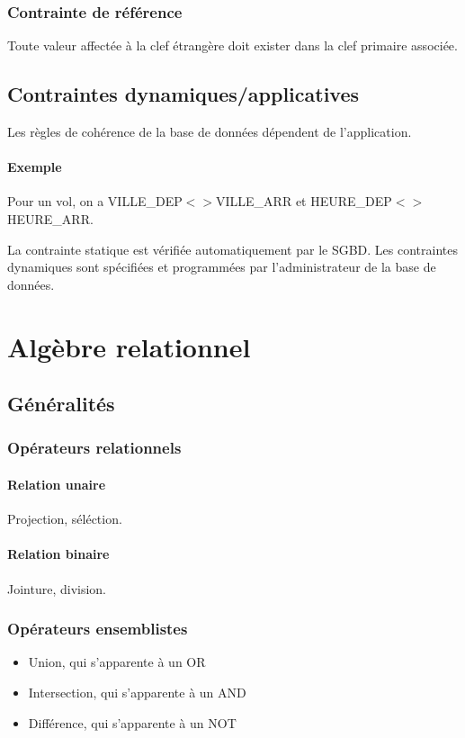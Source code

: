 \documentclass[10pt]{article}
\begin{document}
            \subsubsection*{Contrainte de référence}
                Toute valeur affectée à la clef étrangère doit exister dans la clef primaire associée.

        \subsection{Contraintes dynamiques/applicatives}
            Les règles de cohérence de la base de données dépendent de l'application.

            \paragraph{Exemple}
                Pour un vol, on a VILLE\_DEP$<>$VILLE\_ARR et HEURE\_DEP$<>$HEURE\_ARR.
                
            La contrainte statique est vérifiée automatiquement par le SGBD. Les contraintes dynamiques sont spécifiées et programmées par l'administrateur de la base de données.

    \section{Algèbre relationnel}
        \subsection{Généralités}
            \subsubsection*{Opérateurs relationnels}
                \paragraph{Relation unaire}
                    Projection, séléction.

                \paragraph{Relation binaire}
                    Jointure, division.

            \subsubsection*{Opérateurs ensemblistes}
                \begin{itemize}
                    \item Union, qui s'apparente à un OR
                    \item Intersection, qui s'apparente à un AND
                    \item Différence, qui s'apparente à un NOT
                \end{itemize}
\end{document}
